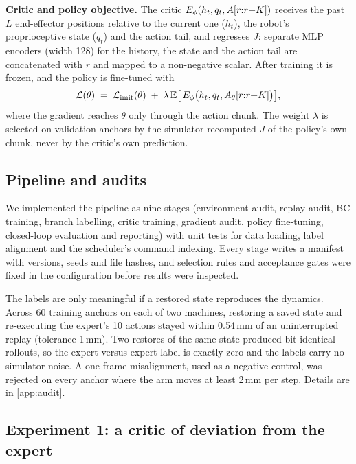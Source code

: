 \textbf{Critic and policy objective.} The critic $E_\phi(h_t, q_t, A[r{:}r{+}K])$ receives the past $L$ end-effector positions relative to the current one ($h_t$), the robot's proprioceptive state ($q_t$) and the action tail, and regresses $J$: separate MLP encoders (width 128) for the history, the state and the action tail are concatenated with $r$ and mapped to a non-negative scalar. After training it is frozen, and the policy is fine-tuned with
\begin{equation}
\mathcal{L}(\theta) \;=\; \mathcal{L}_{\mathrm{imit}}(\theta) \;+\; \lambda\,\mathbb{E}\bigl[\,E_\phi\bigl(h_t, q_t, A_\theta[r{:}r{+}K]\bigr)\bigr],
\label{eq:objective}
\end{equation}
where the gradient reaches $\theta$ only through the action chunk. The weight $\lambda$ is selected on validation anchors by the simulator-recomputed $J$ of the policy's own chunk, never by the critic's own prediction.

\subsection{Pipeline and audits}

We implemented the pipeline as nine stages (environment audit, replay audit, BC training, branch labelling, critic training, gradient audit, policy fine-tuning, closed-loop evaluation and reporting) with unit tests for data loading, label alignment and the scheduler's command indexing. Every stage writes a manifest with versions, seeds and file hashes, and selection rules and acceptance gates were fixed in the configuration before results were inspected.

The labels are only meaningful if a restored state reproduces the dynamics. Across 60 training anchors on each of two machines, restoring a saved state and re-executing the expert's 10 actions stayed within 0.54\,mm of an uninterrupted replay (tolerance 1\,mm). Two restores of the same state produced bit-identical rollouts, so the expert-versus-expert label is exactly zero and the labels carry no simulator noise. A one-frame misalignment, used as a negative control, was rejected on every anchor where the arm moves at least 2\,mm per step. Details are in \cref{app:audit}.

\subsection{Experiment 1: a critic of deviation from the expert}

